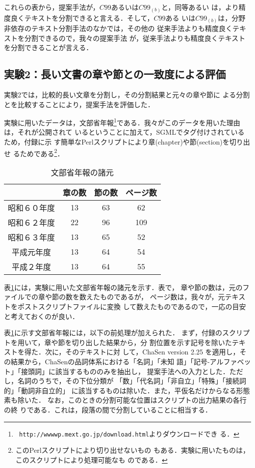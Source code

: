 これらの表から，提案手法が，$C99$あるいは$C99_{(b)}$と，同等あるい
は，より精度良くテキストを分割できると言える．そして，$C99$ある
いは$C99_{(b)}$は，分野非依存のテキスト分割手法のなかでは，その他の
従来手法よりも精度良くテキストを分割できるので，我々の提案手法
が，従来手法よりも精度良くテキストを分割できることが言える．

\subsection{実験2：長い文書の章や節との一致度による評価}
\label{sec:exp2}

実験2では，比較的長い文章を分割し，その分割結果と元々の章や節に
よる分割とを比較することにより，提案手法を評価した．

実験に用いたデータは，文部省年報\footnote{{\tt
    http://wwwwp.mext.go.jp/download.html}よりダウンロードでき
  る．}である．我々がこのデータを用いた理由は，それが公開されて
いるということに加えて，SGMLでタグ付けされているため，付録に示
す簡単なPerlスクリプトにより章(chapter)や節(section)を切り出せ
るためである\footnote{このPerlスクリプトにより切り出せないもの
  もある．実験に用いたものは，このスクリプトにより処理可能なも
  のである．}．

\begin{table}[htbp]
  \begin{center}
    \caption{文部省年報の諸元}
    \begin{tabular}{|c|ccc|}\hline
      &章の数& 節の数& ページ数\\\hline
      昭和６０年度 & 13 & 63 & 62 \\
      昭和６２年度 & 22 & 96 & 109 \\
      昭和６３年度 & 13 & 65 & 52 \\
      平成元年度   & 13 & 64 & 54 \\
      平成２年度   & 13 & 64 & 55\\\hline
    \end{tabular}
    \label{tab:monbu}
  \end{center}
\end{table}

表\ref{tab:monbu}には，実験に用いた文部省年報の諸元を示す．表で，
章や節の数は，元のファイルでの章や節の数を数えたものであるが，
ページ数は，我々が，元テキストをポストスクリプトファイルに変換
して数えたものであるので，一応の目安と考えておくのが良い．

表\ref{tab:monbu}に示す文部省年報には，以下の前処理が加えられた．
まず，付録のスクリプトを用いて，章や節を切り出した結果から，分
割位置を示す記号を除いたテキストを得た．次に，そのテキストに対
して，ChaSen version
2.25\cite{matsumoto99:_japan_morph_analy_system_chasen_manual}
を適用し，その結果から，ChaSenの品詞体系における「名詞」「未知
語」「記号-アルファベット」「接頭詞」に該当するもののみを抽出し，
提案手法への入力とした．ただし，名詞のうちで，その下位分類が
「数」「代名詞」「非自立」「特殊」「接続詞的」「動詞非自立的」
に該当するものは除いた．また，平仮名だけからなる形態素も除いた．
なお，このときの分割可能な位置はスクリプトの出力結果の各行の終
りである．これは，段落の間で分割していることに相当する．

